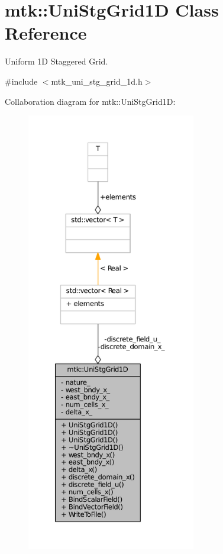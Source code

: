 \hypertarget{classmtk_1_1UniStgGrid1D}{\section{mtk\+:\+:Uni\+Stg\+Grid1\+D Class Reference}
\label{classmtk_1_1UniStgGrid1D}
}


Uniform 1\+D Staggered Grid.  




{\ttfamily \#include $<$mtk\+\_\+uni\+\_\+stg\+\_\+grid\+\_\+1d.\+h$>$}



Collaboration diagram for mtk\+:\+:Uni\+Stg\+Grid1\+D\+:\nopagebreak
\begin{figure}[H]
\begin{center}
\leavevmode
\includegraphics[height=550pt]{classmtk_1_1UniStgGrid1D__coll__graph}
\end{center}
\end{figure}
